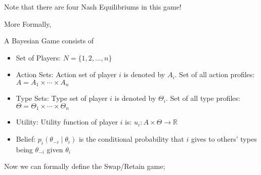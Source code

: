\documentclass[12pt,a4paper]{article}
\begin{document}
Note that there are four Nash Equilibriums in this game!

More Formally, 

A Bayesian Game consists of
\begin{itemize}

\item Set of Players: \(N=\{1,2, \ldots, n\}\)

\item Action Sets: Action set of player \(i\) is denoted by \(A_i\). Set of all action profiles: \(A=A_1 \times \cdots \times A_n\)

\item Type Sets: Type set of player \(i\) is denoted by \(\Theta_i\). Set of all type profiles: \(\Theta=\Theta_1 \times \cdots \times \Theta_n\)

\item Utility: Utility function of player \(i\) is: \(u_i: A \times \Theta \rightarrow \mathbb{R}\)

\item Belief: \(p_i\left(\theta_{-i} \mid \theta_i\right)\) is the conditional probability that \(i\) gives to others' types being \(\theta_{-i}\) given \(\theta_i\)
\end{itemize}


Now we can formally define the Swap/Retain game;
\end{document}
